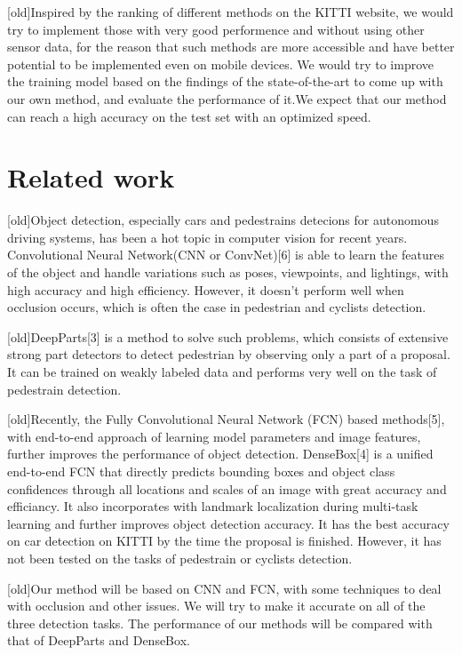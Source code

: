 \documentclass{article} %
\begin{document}
[old]Inspired by the ranking of different methods on the KITTI website, we would try to implement those with very good performence and without using other sensor data, for the reason that such methods are more accessible and have better potential to be implemented even on mobile devices. We would try to improve the training model based on the findings of the state-of-the-art to come up with our own method, and evaluate the performance of it.We expect that our method can reach a high accuracy on the test set with an optimized speed. 

\section{Related work}

[old]Object detection, especially cars and pedestrains detecions for autonomous driving systems, has been a hot topic in computer vision for recent years. Convolutional Neural
Network(CNN or ConvNet)[6] is able to learn the features of the object and handle variations such as poses, viewpoints, and lightings, with high accuracy and high efficiency. However, it doesn't perform well when occlusion occurs, which is often the case in pedestrian and cyclists detection. 

[old]DeepParts[3] is a method to solve such problems, which consists of extensive strong part detectors to detect pedestrian by observing only a part
of a proposal. It can be trained on weakly labeled
data and performs very well on the task of pedestrain detection. 

[old]Recently, the Fully Convolutional Neural Network (FCN) based methods[5], with end-to-end approach of learning model parameters and image features, further improves the performance of object detection. DenseBox[4] is a unified end-to-end FCN that
directly predicts bounding boxes and object class confidences through all locations
and scales of an image with great accuracy and efficiancy. It also incorporates with landmark localization during multi-task learning and further improves
object detection accuracy. It has the best accuracy on car detection on KITTI by the time the proposal is finished. However, it has not been tested on the tasks of pedestrain or cyclists detection.

[old]Our method will be based on CNN and FCN, with some techniques to deal with occlusion and other issues. We will try to make it accurate on all of the three detection tasks. The performance of our methods will be compared with that of DeepParts and DenseBox.
\end{document}
